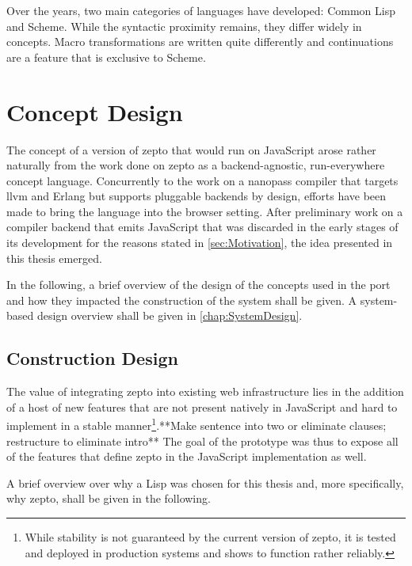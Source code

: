 \documentclass[oneside,11pt,xetex]{scrbook}
\begin{document}
Over the years, two main categories of languages have developed: Common Lisp
and Scheme. While the syntactic proximity remains, they differ widely in
concepts. Macro transformations are written quite differently and continuations
are a feature that is exclusive to Scheme.

\chapter{Concept Design}
\label{chap:ConceptDesign}

The concept of a version of zepto that would run on JavaScript arose rather
naturally from the work done on zepto as a backend-agnostic, run-everywhere
concept language. Concurrently to the work on a nanopass compiler that
targets \gls{llvm} and Erlang but supports pluggable backends by design, efforts
have been made to bring the language into the browser setting. After preliminary
work on a compiler backend that emits JavaScript that was discarded in the
early stages of its development for the reasons stated in \ref{sec:Motivation},
the idea presented in this thesis emerged.

In the following, a brief overview of the design of the concepts used
in the port and how they impacted the construction of the system shall be
given. A system-based design overview shall be given in \ref{chap:SystemDesign}.

\section{Construction Design}
\label{sec:ConstructionDesign}

The value of integrating zepto into existing web infrastructure lies in
the addition of a host of new features that are not present natively in
JavaScript and hard to implement in a stable manner\footnote{While stability
is not guaranteed by the current version of zepto, it is tested and deployed
in production systems and shows to function rather reliably.}.**Make sentence
into two or eliminate clauses; restructure to eliminate intro** The goal of
the prototype was thus to expose all of the features that define zepto in
the JavaScript implementation as well.

A brief overview over why a Lisp was chosen for this thesis and, more specifically,
why zepto, shall be given in the following.
\end{document}
